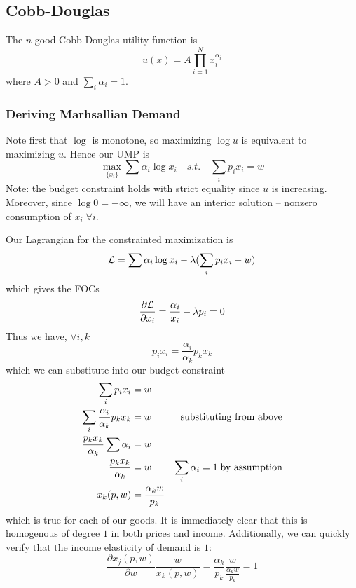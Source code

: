 

\subsection{Cobb-Douglas}
\label{sec:cobb-douglas}

\begin{definition}
  The $n$-good Cobb-Douglas utility function is
  \[
  u(x) = A \prod_{i=1}^N x_i^{\alpha_i}
  \]
  where $A > 0$ and $\sum_i \alpha_i = 1$.
\end{definition}

\subsubsection{Deriving Marhsallian Demand}

Note first that $\log $ is monotone, so maximizing $\log u$ is
equivalent to maximizing $u$. Hence our UMP is
\[
\max_{\{x_i\}} \sum \alpha_i \log x_i \quad s.t. \quad \sum_i p_i x_i = w
\]
Note: the budget constraint holds with strict equality since $u$ is
increasing. Moreover, since $\log 0 = - \infty$, we will have an
interior solution -- nonzero consumption of $x_i \; \forall i$.

Our Lagrangian for the constrainted maximization is
\[
{\cal L} = \sum \alpha_i \log x_i - \lambda(\sum_i p_i x_i - w)
\]
which gives the FOCs
\[
\frac{\partial {\cal L}}{\partial x_i}
= \frac{\alpha_i}{x_i} - \lambda p_i
= 0
\]
Thus we have, $\forall i, k$
\[
p_i x_i = \frac{\alpha_i}{\alpha_k} p_k x_k
\]
which we can substitute into our budget constraint
\begin{align}
  \sum_i p_i x_i & = w & \notag \\
  \sum_i \frac{\alpha_i}{\alpha_k} p_k x_k & = w
  & \text{substituting from above} \notag \\
  \frac{p_kx_k}{\alpha_k} \sum \alpha_i & = w & \notag \\
  \frac{p_kx_k}{\alpha_k} & = w 
  & \sum_i \alpha_i = 1 \; \text{by assumption} \notag \\
  x_k(p, w) & = \frac{\alpha_k w}{p_k} & \notag
\end{align}
which is true for each of our goods. It is immediately clear that this
is homogenous of degree $1$ in both prices and income. Additionally,
we can quickly verify that the income elasticity of demand is $1$:
\[
\frac{\partial x_j(p,w)}{\partial w} \frac{w}{x_k(p,w)}
= \frac{\alpha_k}{p_k} \frac{w}{\frac{\alpha_k w}{p_k}}
= 1
\]

